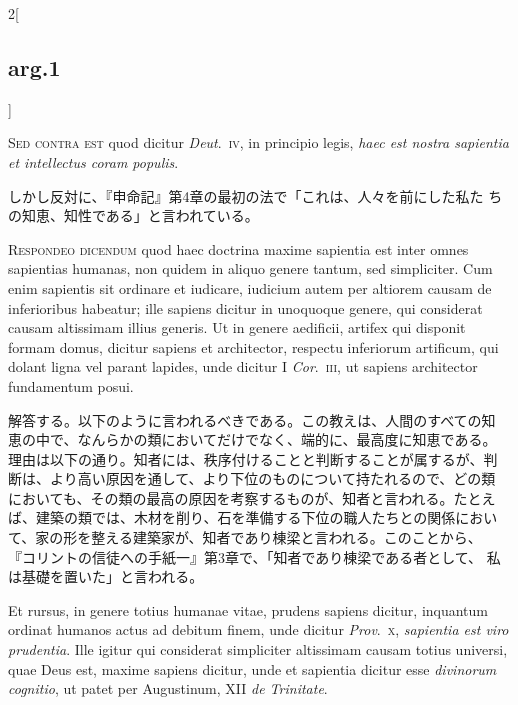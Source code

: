 \documentclass[
paper=a4paper,
fontsize=10pt,
jafontsize=9pt,
titlepage
]{jlreq}
\begin{document}
\begin{paracol}{2}[\subsection{arg.1}]
\switchcolumn*[\subsection{s.c.}]

{\scshape Sed contra est} quod dicitur {\itshape Deut}.~{\scshape iv},
in principio legis, {\itshape haec est nostra sapientia et intellectus
coram populis}.

\switchcolumn

しかし反対に、『申命記』第4章の最初の法で「これは、人々を前にした私た
ちの知恵、知性である」と言われている。


{\scshape Respondeo dicendum} quod haec doctrina maxime sapientia est
inter omnes sapientias humanas, non quidem in aliquo genere tantum,
sed simpliciter. Cum enim sapientis sit ordinare et iudicare, iudicium
autem per altiorem causam de inferioribus habeatur; ille sapiens
dicitur in unoquoque genere, qui considerat causam altissimam illius
generis. Ut in genere aedificii, artifex qui disponit formam domus,
dicitur sapiens et architector, respectu inferiorum artificum, qui
dolant ligna vel parant lapides, unde dicitur I {\itshape
Cor}.~{\scshape iii}, ut sapiens architector fundamentum posui.

\switchcolumn

解答する。以下のように言われるべきである。この教えは、人間のすべての知
恵の中で、なんらかの類においてだけでなく、端的に、最高度に知恵である。
理由は以下の通り。知者には、秩序付けることと判断することが属するが、判
断は、より高い原因を通して、より下位のものについて持たれるので、どの類
においても、その類の最高の原因を考察するものが、知者と言われる。たとえ
ば、建築の類では、木材を削り、石を準備する下位の職人たちとの関係におい
て、家の形を整える建築家が、知者であり棟梁と言われる。このことから、
『コリントの信徒への手紙一』第3章で、「知者であり棟梁である者として、
私は基礎を置いた」と言われる。

\switchcolumn*

Et rursus, in genere totius humanae vitae, prudens sapiens dicitur,
inquantum ordinat humanos actus ad debitum finem, unde dicitur
{\itshape Prov}.~{\scshape x}, {\itshape sapientia est viro
prudentia}. Ille igitur qui considerat simpliciter altissimam causam
totius universi, quae Deus est, maxime sapiens dicitur, unde et
sapientia dicitur esse {\itshape divinorum cognitio}, ut patet per
Augustinum, XII {\itshape de Trinitate}.


\end{paracol}
\end{document}
